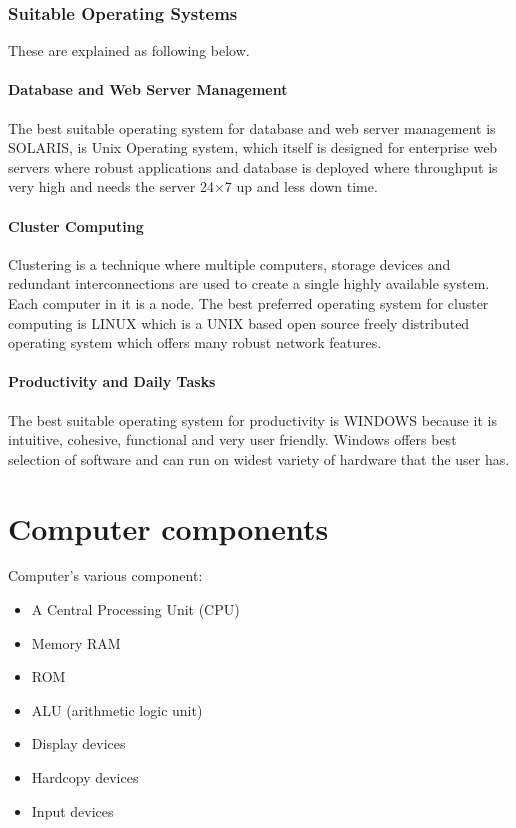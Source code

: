 \documentclass[11pt,a4paper,twoside]{article}
\begin{document}
\section{Suitable Operating Systems}
These are explained as following below.
\subsection{Database and Web Server Management}
The best suitable operating system for database and web server management is SOLARIS, is Unix Operating system, which itself is designed for enterprise web servers where robust applications and database is deployed where throughput is very high and needs the server 24×7 up and less down time.
\subsection{Cluster Computing}
Clustering is a technique where multiple computers, storage devices and redundant interconnections are used to create a single highly available system. Each computer in it is a node. The best preferred operating system for cluster computing is LINUX which is a UNIX based open source freely distributed operating system which offers many robust network features.
\subsection{Productivity and Daily Tasks}
The best suitable operating system for productivity is WINDOWS because it is intuitive, cohesive, functional and very user friendly. Windows offers best selection of software and can run on widest variety of hardware that the user has.
\newpage
\part{Computer components}
Computer's various component:
\begin{itemize}
\item A Central Processing Unit (CPU)
\item Memory RAM
\item ROM
\item ALU (arithmetic logic unit)
\item Display devices
\item Hardcopy devices
\item Input devices
\end{itemize}
\end{document}
